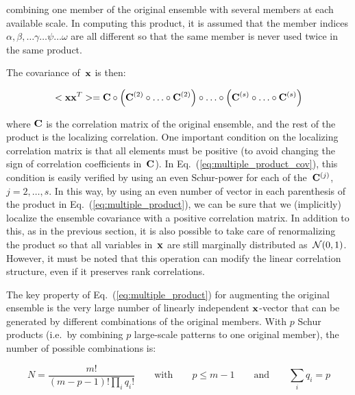 \documentclass[11pt]{article}
\begin{document}
\noindent
combining one member of the original ensemble
with several members at each available scale.
In computing this product, it is assumed that
the member indices $\alpha, \beta, \ldots \gamma \ldots \psi \ldots\omega$
are all different so that the same member
is never used twice in the same product.

The covariance of~${\bf x}$ is then:

\begin{equation}
\label{eq:multiple_product_cov}
<{\bf x} {\bf x}^T > = {\bf C} \circ \left( {\bf C}^{(2)} \circ \ldots \circ {\bf C}^{(2)} \right)
                  \circ \ldots \circ \left( {\bf C}^{(s)} \circ \ldots \circ {\bf C}^{(s)} \right)
\end{equation}

\noindent
where ${\bf C}$ is the correlation matrix of the original ensemble,
and the rest of the product is the localizing correlation.
One important condition on the localizing correlation matrix
is that all elements must be positive
(to avoid changing the sign of correlation coefficients in~${\bf C}$).
In Eq.~(\ref{eq:multiple_product_cov}), this condition is easily verified
by using an even Schur-power for each of the~${\bf C}^{(j)}$, $j=2,\ldots,s$.
In this way, by using an even number of vector in each parenthesis
of the product in Eq.~(\ref{eq:multiple_product}),
we can be sure that we (implicitly) localize the ensemble covariance
with a positive correlation matrix.
In addition to this, as in the previous section, it is also possible
to take care of renormalizing the product so that all variables in~${\bf x}$
are still marginally distributed as~${\cal N}(0,1)$.
However, it must be noted that this operation can modify
the linear correlation structure, even if it preserves rank correlations.

The key property of Eq.~(\ref{eq:multiple_product}) for augmenting the original ensemble
is the very large number of linearly independent ${\bf x}$-vector that can be generated
by different combinations of the original members.
With $p$ Schur products (i.e.\ by combining $p$ large-scale patterns to one original member),
the number of possible combinations is:

\begin{equation}
N = \frac{m!}{(m-p-1)! \prod_i q_i !}
\qquad\mbox{with}\qquad
p \le m-1
\qquad\mbox{and}\qquad
\sum_i q_i = p
\end{equation}
\end{document}
